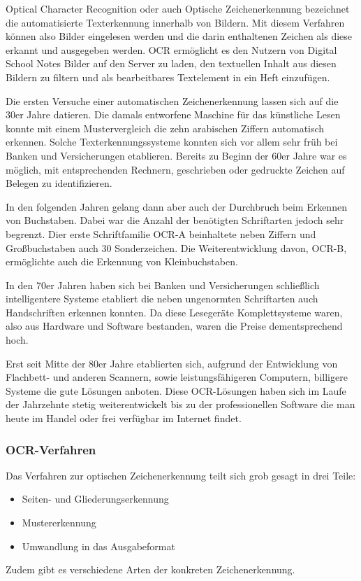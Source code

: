 Optical Character Recognition oder auch Optische Zeichenerkennung bezeichnet die automatisierte Texterkennung innerhalb von Bildern. Mit diesem Verfahren können also Bilder eingelesen werden und die darin enthaltenen Zeichen als diese erkannt und ausgegeben werden. OCR ermöglicht es den Nutzern von Digital School Notes Bilder auf den Server zu laden, den textuellen Inhalt aus diesen Bildern zu filtern und als bearbeitbares Textelement in ein Heft einzufügen.


Die ersten Versuche einer automatischen Zeichenerkennung lassen sich auf die 30er Jahre datieren. Die damals entworfene Maschine für das künstliche Lesen konnte mit einem Mustervergleich die zehn arabischen Ziffern automatisch erkennen. Solche Texterkennungssysteme konnten sich vor allem sehr früh bei Banken und Versicherungen etablieren. Bereits zu Beginn der 60er Jahre war es möglich, mit entsprechenden Rechnern, geschrieben oder gedruckte Zeichen auf Belegen zu identifizieren.

In den folgenden Jahren gelang dann aber auch der Durchbruch beim Erkennen von Buchstaben. Dabei war die Anzahl der benötigten Schriftarten jedoch sehr begrenzt. Dier erste Schriftfamilie OCR-A beinhaltete neben Ziffern und Großbuchstaben auch 30 Sonderzeichen. Die Weiterentwicklung davon, OCR-B, ermöglichte auch die Erkennung von Kleinbuchstaben.

In den 70er Jahren haben sich bei Banken und Versicherungen schließlich intelligentere Systeme etabliert die neben ungenormten Schriftarten auch Handschriften erkennen konnten. Da diese Lesegeräte Komplettsysteme waren, also aus Hardware und Software bestanden, waren die Preise dementsprechend hoch.

Erst seit Mitte der 80er Jahre etablierten sich, aufgrund der Entwicklung von Flachbett- und anderen Scannern, sowie leistungsfähigeren Computern, billigere Systeme die gute Lösungen anboten. Diese OCR-Lösungen haben sich im Laufe der Jahrzehnte stetig weiterentwickelt bis zu der professionellen Software die man heute im Handel oder frei verfügbar im Internet findet.

\subsubsection{OCR-Verfahren}
Das Verfahren zur optischen Zeichenerkennung teilt sich grob gesagt in drei Teile:
\begin{itemize}
\item Seiten- und Gliederungserkennung
\item Mustererkennung
\item Umwandlung in das Ausgabeformat
\end{itemize}
Zudem gibt es verschiedene Arten der konkreten Zeichenerkennung.

